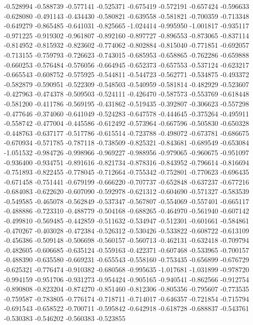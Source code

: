 -0.528994
-0.588739
-0.577141
-0.525371
-0.675419
-0.572191
-0.657424
-0.596633
-0.628080
-0.491143
-0.434430
-0.580821
-0.639558
-0.581821
-0.700359
-0.713348
-0.649279
-0.865485
-0.641031
-0.825665
-1.024414
-0.995950
-1.001817
-0.935117
-0.971225
-0.919302
-0.961807
-0.892160
-0.897727
-0.896553
-0.873065
-0.837114
-0.814952
-0.815932
-0.823602
-0.774062
-0.802884
-0.815040
-0.771851
-0.692057
-0.713155
-0.759793
-0.726623
-0.743015
-0.685953
-0.658865
-0.762286
-0.659888
-0.660253
-0.576484
-0.576056
-0.664945
-0.652373
-0.657553
-0.537124
-0.623217
-0.665543
-0.608752
-0.575925
-0.544811
-0.544723
-0.562771
-0.534875
-0.493372
-0.582879
-0.590951
-0.522309
-0.548503
-0.540959
-0.581814
-0.482929
-0.523607
-0.427963
-0.474378
-0.509503
-0.524111
-0.426470
-0.587573
-0.553769
-0.618448
-0.581200
-0.411786
-0.569195
-0.431862
-0.519435
-0.392807
-0.306623
-0.557298
-0.477646
-0.374060
-0.641049
-0.524283
-0.647578
-0.444645
-0.375264
-0.495911
-0.558742
-0.477004
-0.445586
-0.612492
-0.573964
-0.667596
-0.505830
-0.650328
-0.448763
-0.637177
-0.517786
-0.615514
-0.723788
-0.498072
-0.673781
-0.686675
-0.670934
-0.571785
-0.787118
-0.738509
-0.825321
-0.843681
-0.689549
-0.653084
-1.051532
-0.984726
-0.998966
-0.969227
-0.988956
-0.979065
-0.960675
-0.951097
-0.936400
-0.934751
-0.891616
-0.821734
-0.878316
-0.843952
-0.796614
-0.816694
-0.751893
-0.822455
-0.778045
-0.712664
-0.755342
-0.752801
-0.770623
-0.696435
-0.671458
-0.751441
-0.679199
-0.666220
-0.707737
-0.652848
-0.637237
-0.677216
-0.684083
-0.622620
-0.607090
-0.592978
-0.621312
-0.604690
-0.571327
-0.583539
-0.549585
-0.465078
-0.562849
-0.537347
-0.567807
-0.554069
-0.557401
-0.665117
-0.488886
-0.723310
-0.488779
-0.504168
-0.688265
-0.464970
-0.561940
-0.607142
-0.499810
-0.569485
-0.442859
-0.511632
-0.534947
-0.512301
-0.601661
-0.584861
-0.470267
-0.403028
-0.472384
-0.526312
-0.530426
-0.533822
-0.608722
-0.613109
-0.456386
-0.509148
-0.506698
-0.560157
-0.560713
-0.462131
-0.632418
-0.709794
-0.482605
-0.606685
-0.635124
-0.559163
-0.422371
-0.607468
-0.533965
-0.700157
-0.488390
-0.635580
-0.669231
-0.655543
-0.558160
-0.753435
-0.656899
-0.676729
-0.625321
-0.776474
-0.910382
-0.680568
-0.995635
-1.017681
-1.031899
-0.978720
-0.994159
-0.951706
-0.931273
-0.954424
-0.905165
-0.940541
-0.862566
-0.912754
-0.890808
-0.823204
-0.874270
-0.851460
-0.812306
-0.805356
-0.795607
-0.773535
-0.759587
-0.783805
-0.776174
-0.718711
-0.714017
-0.646357
-0.721854
-0.715794
-0.691543
-0.658522
-0.700711
-0.595842
-0.642918
-0.618728
-0.688837
-0.543761
-0.530383
-0.546202
-0.560383
-0.523855
